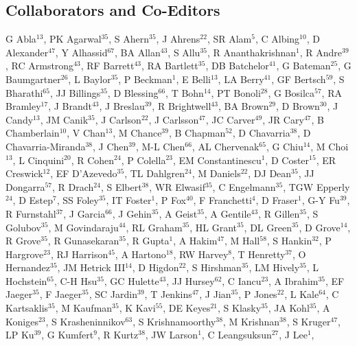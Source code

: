 \subsection*{Collaborators and Co-Editors}
\noindent
G Abla$^{13}$,
PK Agarwal$^{35}$,
S Ahern$^{35}$,
J Ahrens$^{22}$,
SR Alam$^{5}$,
C Albing$^{10}$,
D Alexander$^{47}$,
Y Alhassid$^{67}$,
BA Allan$^{43}$,
S Allu$^{35}$,
R Ananthakrishnan$^{1}$,
R Andre$^{39}$,
RC Armstrong$^{43}$,
RF Barrett$^{43}$,
RA Bartlett$^{35}$,
DB Batchelor$^{41}$,
G Bateman$^{25}$,
G Baumgartner$^{26}$,
L Baylor$^{35}$,
P Beckman$^{1}$,
E Belli$^{13}$,
LA Berry$^{41}$,
GF Bertsch$^{59}$,
S Bharathi$^{65}$,
JJ Billings$^{35}$,
D Blessing$^{66}$,
T Bohn$^{14}$,
PT Bonoli$^{28}$,
G Bosilca$^{57}$,
RA Bramley$^{17}$,
J Brandt$^{43}$,
J Breslau$^{39}$,
R Brightwell$^{43}$,
BA Brown$^{29}$,
D Brown$^{30}$,
J Candy$^{13}$,
JM Canik$^{35}$,
J Carlson$^{22}$,
J Carlsson$^{47}$,
JC Carver$^{49}$,
JR Cary$^{47}$,
B Chamberlain$^{10}$,
V Chan$^{13}$,
M Chance$^{39}$,
B Chapman$^{52}$,
D Chavarria$^{38}$,
D Chavarria-Miranda$^{38}$,
J Chen$^{39}$,
M-L Chen$^{66}$,
AL Chervenak$^{65}$,
G Chiu$^{14}$,
M Choi$^{13}$,
L Cinquini$^{20}$,
R Cohen$^{24}$,
P Colella$^{23}$,
EM Constantinescu$^{1}$,
D Coster$^{15}$,
ER Creswick$^{12}$,
EF D'Azevedo$^{35}$,
TL Dahlgren$^{24}$,
M Daniels$^{22}$,
DJ Dean$^{35}$,
JJ Dongarra$^{57}$,
R Drach$^{24}$,
S Elbert$^{38}$,
WR Elwasif$^{35}$,
C Engelmann$^{35}$,
TGW Epperly$^{24}$,
D Estep$^{7}$,
SS Foley$^{35}$,
IT Foster$^{1}$,
P Fox$^{40}$,
F Franchetti$^{4}$,
D Fraser$^{1}$,
G-Y Fu$^{39}$,
R Furnstahl$^{37}$,
J Garcia$^{66}$,
J Gehin$^{35}$,
A Geist$^{35}$,
A Gentile$^{43}$,
R Gillen$^{35}$,
S Golubov$^{35}$,
M Govindaraju$^{44}$,
RL Graham$^{35}$,
HL Grant$^{35}$,
DL Green$^{35}$,
D Grove$^{14}$,
R Grove$^{35}$,
R Gunasekaran$^{35}$,
R Gupta$^{1}$,
A Hakim$^{47}$,
M Hall$^{58}$,
S Hankin$^{32}$,
P Hargrove$^{23}$,
RJ Harrison$^{45}$,
A Hartono$^{18}$,
RW Harvey$^{8}$,
T Henretty$^{37}$,
O Hernandez$^{35}$,
JM Hetrick III$^{14}$,
D Higdon$^{22}$,
S Hirshman$^{35}$,
LM Hively$^{35}$,
L Hochstein$^{65}$,
C-H Hsu$^{35}$,
GC Hulette$^{43}$,
JJ Hursey$^{62}$,
C Iancu$^{23}$,
A Ibrahim$^{35}$,
EF Jaeger$^{35}$,
F Jaeger$^{35}$,
SC Jardin$^{39}$,
T Jenkins$^{47}$,
J Jian$^{35}$,
P Jones$^{22}$,
L Kale$^{64}$,
C Kartsaklis$^{35}$,
M Kaufman$^{35}$,
K Kavi$^{55}$,
DE Keyes$^{21}$,
S Klasky$^{35}$,
JA Kohl$^{35}$,
A Koniges$^{23}$,
S Krasheninnikov$^{63}$,
S Krishnamoorthy$^{38}$,
M Krishnan$^{38}$,
S Kruger$^{47}$,
LP Ku$^{39}$,
G Kumfert$^{9}$,
R Kurtz$^{38}$,
JW Larson$^{1}$,
C Leangsuksun$^{27}$,
J Lee$^{1}$,
